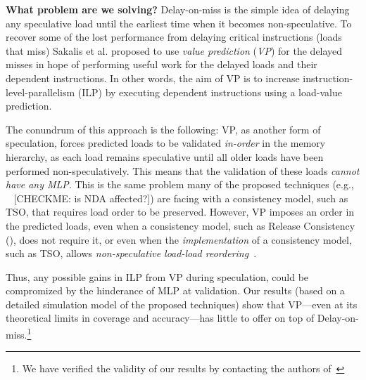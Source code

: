 \noindent \textbf{What problem are we solving?} Delay-on-miss is the simple idea of delaying any speculative load until the earliest time when it becomes non-speculative. 
To recover some of the lost performance from delaying critical instructions (loads that miss) Sakalis et al. proposed to use \emph{value prediction} (\emph{VP}) for the delayed misses in hope of performing useful work for the delayed loads and their dependent instructions. In other words, the aim of VP is to increase instruction-level-parallelism (ILP) by executing dependent instructions using a load-value prediction. 

The conundrum of this approach is the following: VP, as another form of speculation, forces predicted loads to be validated \emph{in-order} in the memory hierarchy, as each load remains speculative until all older loads have been performed non-speculatively. This means that the validation of these loads \emph{cannot have any MLP}. 
This is the same problem many of the proposed techniques (e.g., ~\cite{yan_invisispec:MICRO2018,sakalis+:CF2019ghost,sakalis+:ISCA2019vp,weisse2019nda}{\color{red} [CHECKME: is NDA affected?]}) are facing with a consistency model, such as TSO, that requires load order to be preserved. 
However, VP imposes an order in the predicted loads, even when a consistency model, such as Release Consistency (\rc), does not require it, or even when the \emph{implementation} of a consistency model, such as TSO, allows \emph{non-speculative load-load reordering}~\cite{aros-isca17}.

Thus, any possible gains in ILP from VP during speculation, could be compromized by the hinderance of MLP at validation.
{\color{red} Our results (based on a detailed simulation model of the proposed techniques) show that VP---even at its theoretical limits in coverage and accuracy---has little to offer on top of Delay-on-miss.\footnote{We have verified the validity of our results by contacting the authors of~\cite{sakalis+:ISCA2019vp}}}

